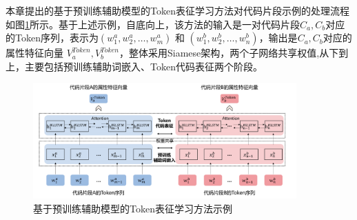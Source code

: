 
    
    

    

本章提出的基于预训练辅助模型的Token表征学习方法对代码片段示例的处理流程如图\ref{fig:token}所示。基于上述示例，自底向上，该方法的输入是一对代码片段$C_{a},C_{b}$对应的Token序列，表示为$\left( w_{1}^{a},w_{2}^{a},\ldots,w_{m}^{a}\right)$ 和 $\left( w_{1}^{b},w_{2}^{b},\ldots,w_{n}^{b} \right)$，输出是$C_{a},C_{b}$对应的属性特征向量 $V_{a}^{Token},V_{b}^{Token}$，整体采用Siamese架构，两个子网络共享权值,从下到上，主要包括预训练辅助词嵌入、Token代码表征两个阶段。
\begin{figure}[htp]
  \centering
  \includegraphics[width=0.9\textwidth]{figures/token}
  \caption{基于预训练辅助模型的Token表征学习方法示例}\label{fig:token}
\end{figure}

